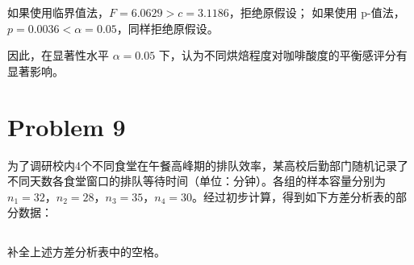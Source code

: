 \documentclass[12pt,a4paper]{article}
\begin{document}
\begin{answerbox}
如果使用临界值法，$F = 6.0629 > c = 3.1186$，拒绝原假设；
如果使用 p-值法，$p = 0.0036 < \alpha = 0.05$，同样拒绝原假设。

因此，在显著性水平 $\alpha=0.05$ 下，认为不同烘焙程度对咖啡酸度的平衡感评分有显著影响。

\end{answerbox}

\section{Problem 9}

为了调研校内4个不同食堂在午餐高峰期的排队效率，某高校后勤部门随机记录了不同天数各食堂窗口的排队等待时间（单位：分钟）。各组的样本容量分别为 $n_1=32$，$n_2=28$，$n_3=35$，$n_4=30$。经过初步计算，得到如下方差分析表的部分数据：

\begin{table}[htbp]
\centering
\caption{各食堂排队时间方差分析表}
\label{tab:anova-canteen}
\renewcommand{\arraystretch}{1.2}
\end{table}


\subsection{}

补全上述方差分析表中的空格。
\end{document}
